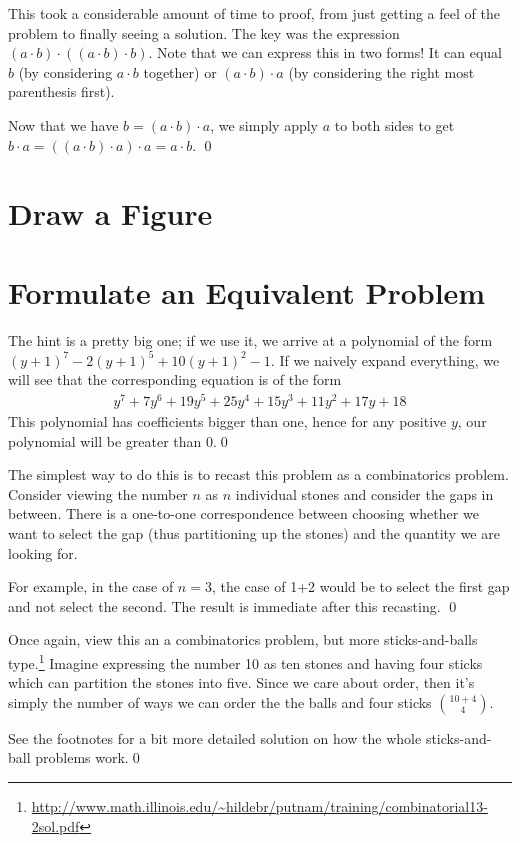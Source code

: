 \documentclass[11pt]{book} %
\begin{document}
\begin{Exercise}
	This took a considerable amount of time to proof, from just getting a feel of the problem to finally seeing a solution.
	The key was the expression $(a\cdot b) \cdot ((a\cdot b) \cdot b)$. Note that we can express this in two forms! 
	It can equal $b$ (by considering $a\cdot b$ together) or $(a\cdot b) \cdot a$ (by considering the right most parenthesis first).

	Now that we have $b = (a\cdot b) \cdot a$, we simply apply $a$ to both sides to get $b \cdot a = ((a\cdot b) \cdot a) \cdot a = a \cdot b$. \qed
\end{Exercise}

\section{Draw a Figure}

\section{Formulate an Equivalent Problem}
\setcounter{Exercise}{7}
\begin{Exercise}
	The hint is a pretty big one; if we use it, we arrive at a polynomial of the form $(y+1)^7 - 2(y+1)^5 + 10(y+1)^2 - 1$.
	If we naively expand everything, we will see that the corresponding equation is of the form
	\begin{align}
		y^7 + 7y^6 + 19y^5 + 25y^4 + 15y^3 + 11y^2 + 17y + 18
	\end{align}
	This polynomial has coefficients bigger than one, hence for any positive $y$, our polynomial will be greater than 0.\qed
\end{Exercise}

\begin{Exercise}
	The simplest way to do this is to recast this problem as a combinatorics problem. 
	Consider viewing the number $n$ as $n$ individual stones and consider the gaps in between.
	There is a one-to-one correspondence between choosing whether we want to select the gap (thus partitioning up the stones)
	and the quantity we are looking for. 

	For example, in the case of $n=3$, the case of 1+2 would be to select the first gap and not select the second. 
	The result is immediate after this recasting. \qed
\end{Exercise}

\begin{Exercise}
	Once again, view this an a combinatorics problem, but more sticks-and-balls type.\footnote{\url{http://www.math.illinois.edu/~hildebr/putnam/training/combinatorial13-2sol.pdf}} Imagine expressing the number 10 as ten stones and having four sticks
	which can partition the stones into five. Since we care about order, then it's simply the number of ways we can order the
	the balls and four sticks $\binom{10+4}{4}$. 

	See the footnotes for a bit more detailed solution on how the whole sticks-and-ball problems work.\qed
\end{Exercise}
\end{document}
